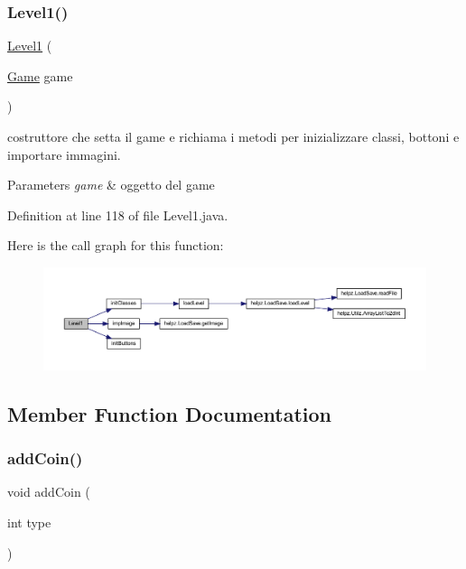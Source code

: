 \subsubsection{\texorpdfstring{Level1()}{Level1()}}
{\footnotesize\ttfamily \hyperlink{classscenes_1_1_level1}{Level1} (\begin{DoxyParamCaption}\item[{\hyperlink{classprogetto_1_1_game}{Game}}]{game }\end{DoxyParamCaption})}



costruttore che setta il game e richiama i metodi per inizializzare classi, bottoni e importare immagini. 


\begin{DoxyParams}{Parameters}
{\em game} & oggetto del game \\
\hline
\end{DoxyParams}


Definition at line 118 of file Level1.\+java.

Here is the call graph for this function\+:\nopagebreak
\begin{figure}[H]
\begin{center}
\leavevmode
\includegraphics[width=350pt]{classscenes_1_1_level1_a0662011b3c0aa5d7dd21ce7cf353c3a0_cgraph}
\end{center}
\end{figure}


\subsection{Member Function Documentation}
\mbox{\label{classscenes_1_1_level1_a9f0f7dc28e596d2ebcd06e27ef05d9fd}} 
\subsubsection{\texorpdfstring{add\+Coin()}{addCoin()}}
{\footnotesize\ttfamily void add\+Coin (\begin{DoxyParamCaption}\item[{int}]{type }\end{DoxyParamCaption})}



